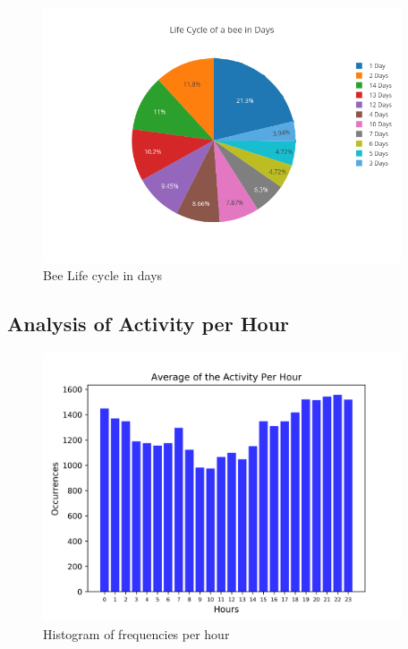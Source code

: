 \documentclass[11pt,fleqn]{book} %
\begin{document}
%


\begin{figure}[h!]%
\centering%
\includegraphics[width=400px]{Pictures/plots/good/Morelia Hive 2pieBeeLifeCycleUnclean.png}%
\caption{Bee Life cycle in days}%
\end{figure}

%
\subsection{Analysis of Activity per Hour}%
\label{subsec:Analysis of Activity per Hour}%


\begin{figure}[h!]%
\centering%
\includegraphics[width=400px]{Pictures/plots/good/Morelia Hive 2histogramUnclean.png}%
\caption{Histogram of frequencies per hour}%
\end{figure}

%
\end{document}
